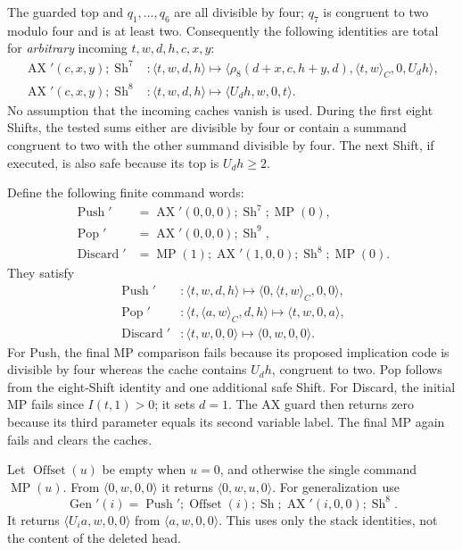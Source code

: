 The guarded top and $q_1,\ldots,q_6$ are all divisible by four; $q_7$ is
congruent to two modulo four and is at least two.  Consequently the following
identities are total for \emph{arbitrary} incoming $t,w,d,h,c,x,y$:
\begin{align*}
 \operatorname{AX}'(c,x,y);\operatorname{Sh}^{7}
 &: \langle t,w,d,h\rangle\longmapsto
    \langle\rho_8(d+x,c,h+y,d),\langle t,w\rangle_C,0,U_dh\rangle,\\
 \operatorname{AX}'(c,x,y);\operatorname{Sh}^{8}
 &: \langle t,w,d,h\rangle\longmapsto
    \langle U_dh,w,0,t\rangle.
\end{align*}
No assumption that the incoming caches vanish is used.  During the first
eight Shifts, the tested sums either are divisible by four or contain a
summand congruent to two with the other summand divisible by four.  The next
Shift, if executed, is also safe because its top is $U_dh\ge2$.

Define the following finite command words:
\begin{align*}
 \operatorname{Push}'&=
   \operatorname{AX}'(0,0,0);\operatorname{Sh}^{7};\operatorname{MP}(0),\\
 \operatorname{Pop}'&=
   \operatorname{AX}'(0,0,0);\operatorname{Sh}^{9},\\
 \operatorname{Discard}'&=
   \operatorname{MP}(1);\operatorname{AX}'(1,0,0);
   \operatorname{Sh}^{8};\operatorname{MP}(0).
\end{align*}
They satisfy
\begin{align*}
 \operatorname{Push}' &: \langle t,w,d,h\rangle\longmapsto
     \langle0,\langle t,w\rangle_C,0,0\rangle,\\
 \operatorname{Pop}' &: \langle t,\langle a,w\rangle_C,d,h\rangle
     \longmapsto\langle t,w,0,a\rangle,\\
 \operatorname{Discard}' &: \langle t,w,0,0\rangle
     \longmapsto\langle0,w,0,0\rangle.
\end{align*}
For Push, the final MP comparison fails because its proposed implication
code is divisible by four whereas the cache contains $U_dh$, congruent to
two.  Pop follows from the eight-Shift identity and one additional safe
Shift.  For Discard, the initial MP fails since $I(t,1)>0$; it sets $d=1$.
The AX guard then returns zero because its third parameter equals its second
variable label.  The final MP again fails and clears the caches.

Let $\operatorname{Offset}(u)$ be empty when $u=0$, and otherwise the single
command $\operatorname{MP}(u)$.  From
$\langle0,w,0,0\rangle$ it returns $\langle0,w,u,0\rangle$.
For generalization use
\[
 \operatorname{Gen}'(i)=\operatorname{Push}';\operatorname{Offset}(i);
 \operatorname{Sh};\operatorname{AX}'(i,0,0);\operatorname{Sh}^{8}.
\]
It returns $\langle U_i a,w,0,0\rangle$ from
$\langle a,w,0,0\rangle$.  This uses only the stack identities, not the
content of the deleted head.

